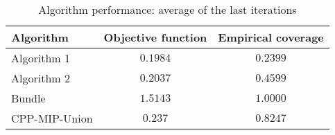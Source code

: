 \begin{table}[ht]
    \centering
    \begin{tabular}{lcc}
    \toprule
    \textbf{Algorithm} & \textbf{Objective function} & \textbf{Empirical coverage} \\
    \midrule
    Algorithm 1 & $0.1984$ & $0.2399$ \\
Algorithm 2 & $0.2037$ & $0.4599$ \\
Bundle & $1.5143$ & $1.0000$ \\
CPP-MIP-Union & $0.237$ & $0.8247$ \\
\bottomrule
    \end{tabular}
    \caption{Algorithm performance: average of the last iterations}
    \end{table}